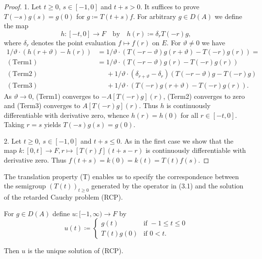 \begin{proof}
1. Let $t \geq 0$, $s \in [-1,0]$ and $t+s  >  0$.
It suffices to prove $T(-s)g(s) = g(0)$ for $g  \coloneq  T(t+s)f$.
For arbitrary $g \in D(A)$ we define the map
\[h : [-t,0] \to F \quad \text{by} \quad h(r) \coloneq  \delta_{r}T(-r)g,\]
where $\delta_{r}$ denotes the point evaluation $f \mapsto f(r)$ on $E$.
For $\vartheta \neq 0$ we have
\begin{align*}
	1/\vartheta\cdot(h(r+\vartheta) - h(r)) & = 1/\vartheta\cdot(T(-r-\vartheta)g(r+\vartheta) - T(-r)g(r)) =\\
	(\mathrm{Term1})\quad  &= 1/\vartheta\cdot(T(-r-\vartheta)g(r) - T(-r)g(r)) \\
	(\mathrm{Term2})\quad  &\phantom{= }  + 1/\vartheta\cdot(\delta_{r+\vartheta} - \delta_{r})(T(-r-\vartheta)g - T(-r)g) \\
	(\mathrm{Term3})\quad &\phantom{= }  + 1/\vartheta\cdot(T(-r)g(r+\vartheta) - T(-r)g(r)).
\end{align*}
As $\vartheta \to 0$, (Term1) converges to $-A[T(-r)g](r)$, (Term2) converges to zero and (Term3) converges to $A[T(-r)g](r)$.
Thus $h$ is continuously differentiable with derivative zero, whence $h(r) = h(0)$ for all $r \in [-t,0]$.
Taking $r = s$ yields $T(-s)g(s) = g(0)$.

2. Let $t \geq 0$, $s \in [-1,0]$ and $t+s \leq 0$.
As in the first case we show that the map $k : [0,t] \to F , r \mapsto [T(r)f](t+s-r)$ is continuously differentiable with derivative zero.
Thus $f(t+s) = k(0) = k(t) = T(t)f(s)$.
\end{proof}

The translation property (T) enables us to specify the correspondence between the semigroup $(T(t))_{t\geq 0}$ generated by the operator in (3.1) and the solution of the retarded Cauchy problem (RCP).
\begin{corollary}\label{cor:b4-3.2}
	For $g \in D(A)$ define $u : [-1,\infty) \to F$ by
	\[u(t)  \coloneq  \begin{cases}
		g(t) & \text{if } -1 \leq t \leq 0 \\
		T(t)g(0) & \text{if } 0 < t.
	\end{cases}\]
	
	Then $u$ is the unique solution of (RCP).
\end{corollary}

